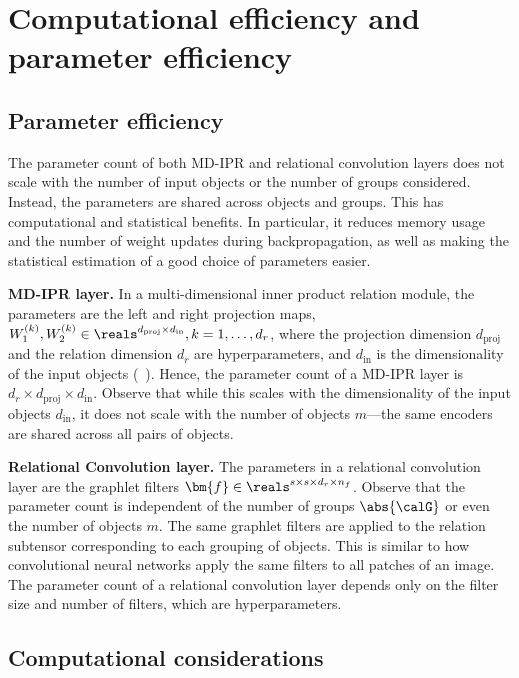 \section{Computational efficiency and parameter efficiency}\label{sec:appendix_comp_param_efficiency}
\subsection{Parameter efficiency}\label{ssec:appendix_param_efficiency}

The parameter count of both MD-IPR and relational convolution layers does not scale with the number of input objects or the number of groups considered. Instead, the parameters are shared across objects and groups. This has computational and statistical benefits. In particular, it reduces memory usage and the number of weight updates during backpropagation, as well as making the statistical estimation of a good choice of parameters easier.

\textbf{MD-IPR layer.} In a multi-dimensional inner product relation module, the parameters are the left and right projection maps, $W_1^{(k)}, W_2^{(k)} \in \reals^{d_{\mathrm{proj}} \times d_{\mathrm{in}}}, k = 1, \ldots, d_r$, where the projection dimension $d_{\mathrm{proj}}$ and the relation dimension $d_r$ are hyperparameters, and $d_{\mathrm{in}}$ is the dimensionality of the input objects (~). Hence, the parameter count of a MD-IPR layer is $d_r \times d_{\mathrm{proj}} \times d_{\mathrm{in}}$. Observe that while this scales with the dimensionality of the input objects $d_{\mathrm{in}}$, it does not scale with the number of objects $m$---the same encoders are shared across all pairs of objects.

\textbf{Relational Convolution layer.} The parameters in a relational convolution layer are the graphlet filters $\bm{f} \in \reals^{s \times s \times d_r \times n_f}$. Observe that the parameter count is independent of the number of groups $\abs{\calG}$ or even the number of objects $m$. The same graphlet filters are applied to the relation subtensor corresponding to each grouping of objects. This is similar to how convolutional neural networks apply the same filters to all patches of an image. The parameter count of a relational convolution layer depends only on the filter size and number of filters, which are hyperparameters.

\subsection{Computational considerations}\label{ssec:computational_considerations}


